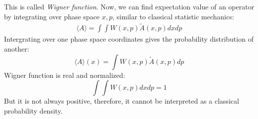 \documentclass{article}
\begin{document}
This is called \emph{Wigner function}. Now, we can find expectation value of an operator by 
integrating over phase space $x,p$, similar to classical statistic mechanics:
\begin{align}
    \langle A \rangle = \int \int W(x,p) \tilde{A}(x,p) dx dp
\end{align}
Intergrating over one phase space coordinates gives the probability distribution of another:
\begin{equation}
    \langle A \rangle (x) = \int W(x,p) \tilde{A}(x,p) dp
\end{equation}
Wigner function is real and normalized:
\begin{equation}
    \int\int W(x,p) dx dp = 1
\end{equation}
But it is not always positive, therefore, it cannot be interpreted as a classical probability density.
\end{document}
